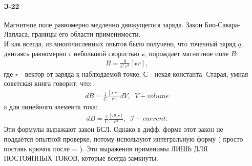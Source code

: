 \documentclass[__main__.tex]{subfiles}
\begin{document}
\paragraph{Э-22}
Магнитное поле равномерно медленно движущегося заряда. Закон Био-Савара-Лапласа, границы его области применимости.\\

И как всегда, из многочисленных опытов было получено, что точечный заряд $q$,
двигаясь равномерно с небольшой скоростью $\mathcal v$,
порождает магнитное поле $B:$
\begin{gather*}
	B = \frac{q}{C\;r^3}\left[\mathcal{v}r\right],
\end{gather*}
где $r$ - вектор от заряда к наблюдаемой точке, С - некая константа.
Старая, умная советская книга говорит, что:
\begin{gather*}
	dB = \frac{1}{C}\frac{\left[j\;r\right]}{r^3}dV, \;\;V-volume
\end{gather*}
а для линейного элемента тока:
\begin{gather*}
	dB = \frac{\mathcal I}{C}\frac{\left[dl\;r\right]}{r^3},\;\;\mathcal{I}-current.
\end{gather*}
Эти формулы выражают закон БСЛ. Однако в дифф. форме этот закон не поддаётся опытной проверке, потому используют интегральную форму ( просто поставь крючок после = ).
Эти выражения применимы ЛИШЬ ДЛЯ ПОСТОЯННЫХ ТОКОВ, которые всегда замкнуты.
\end{document}
